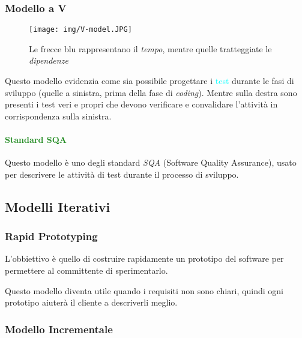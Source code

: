 \subsubsection{Modello a V}

\begin{center}
    \begin{figure}[h]
            \texttt{[image: img/V-model.JPG]}
        \caption{Le frecce blu rappresentano il \emph{tempo}, mentre quelle tratteggiate le \emph{dipendenze}}
    \end{figure}
\end{center}

Questo modello evidenzia come sia possibile progettare i \textcolor{cyan}{test}
durante le fasi di sviluppo (quelle a sinistra, prima della fase di \emph{coding}). Mentre sulla destra
sono presenti i test veri e propri che devono verificare e convalidare l'attività in corrispondenza sulla sinistra.

\paragraph{\textcolor{ForestGreen}{Standard SQA}}
Questo modello è uno degli standard \emph{SQA} (Software Quality Assurance), usato
per descrivere le attività di test durante il processo di sviluppo.

\subsection{Modelli Iterativi}

\subsubsection{Rapid Prototyping}

L'obbiettivo è quello di costruire rapidamente un prototipo del software per permettere al committente di sperimentarlo.

Questo modello diventa utile quando i requisiti non sono chiari, quindi ogni prototipo aiuterà il cliente a descriverli meglio.

\begin{center}
\end{center}

\subsubsection{Modello Incrementale}